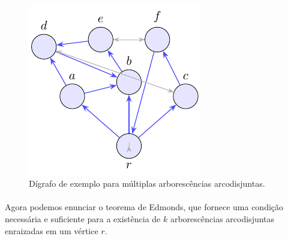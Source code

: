 \documentclass[12pt,a4paper]{article}
\begin{document}
\paragraph{}

\begin{figure}[H]
    \centering
    \includegraphics[width=0.9\linewidth]{figures/fig_exemplo_multiplas_arborescencias.pdf}

    \caption{Dígrafo de exemplo para múltiplas arborescências arcodisjuntas.}
    \label{fig:exemplo-multiplas-arborescencias}\end{figure}


\paragraph{}
Agora podemos enunciar o teorema de Edmonds, que fornece uma condição necessária e suficiente para a existência de \(k\) arborescências arcodisjuntas enraizadas em um vértice \(r\).
\end{document}

